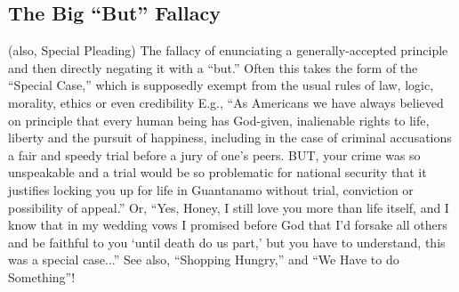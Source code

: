 \documentclass[10pt,a4paper,british]{article}
\begin{document}
\begin{multicols}{2}
	\subsection{The Big ``But'' Fallacy} (also, Special Pleading)  The fallacy
	of enunciating a generally{-}accepted principle and then directly negating
	it with a ``but.'' Often this takes the form of the ``Special Case,'' which
	is supposedly exempt from the usual rules of law, logic, morality, ethics
	or even credibility  E.g., ``As Americans we have always believed on
	principle that every human being has God{-}given, inalienable rights to
	life, liberty and the pursuit of happiness, including in the case of
	criminal accusations a fair and speedy trial before a jury of one's peers.
	BUT, your crime was so unspeakable and a trial would be so problematic for
	national security that it justifies locking you up for life in Guantanamo
	without trial, conviction or possibility of appeal.''  Or, ``Yes, Honey, I
	still love you more than life itself, and I know that in my wedding vows I
	promised before God that I'd forsake all others and be faithful to you
	`until death do us part,' but you have to understand, this was a special
	case...''  See also, ``Shopping Hungry,'' and ``We Have to do Something''!


\end{multicols}
\end{document}
